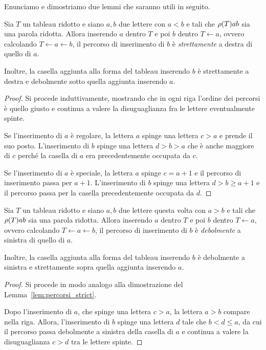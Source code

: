Enunciamo e dimostriamo due lemmi che saranno utili in seguito.

\begin{lemma} \label{lem:percorsi_strict}
    Sia $T$ un tableau ridotto e siano $a, b$ due lettere con $a < b$ e tali che 
    $\operatorname{\rho}(T)ab$ sia una parola ridotta.
    Allora inserendo $a$ dentro $T$ e poi $b$ dentro $T \leftarrow a$, ovvero
    calcolando $T \leftarrow a \leftarrow b$, il percorso di inserimento di $b$ \`e 
    \emph{strettamente} a destra di quello di $a$.

    Inoltre, la casella aggiunta alla forma del tableau inserendo $b$ \`e
    strettamente a destra e debolmente sotto quella aggiunta inserendo $a$.
\end{lemma}

\begin{proof}
    Si procede induttivamente, mostrando che in ogni riga l'ordine dei percorsi
    \`e quello giusto e continua a valere la disuguaglianza fra le lettere eventualmente
    spinte.

    Se l'inserimento di $a$ \`e regolare, la lettera $a$ spinge una lettera $c > a$ e
    prende il suo posto.
    L'inserimento di $b$ spinge una lettera $d > b > a$ che \`e anche maggiore di $c$
    perch\'e la casella di $a$ era precedentemente occupata da $c$.

    Se l'inserimento di $a$ \`e speciale, la lettera $a$ spinge $c=a+1$ e il percorso di
    inserimento passa per $a+1$.
    L'inserimento di $b$ spinge una lettera $d > b \geq a+1$ e il percorso passa per la
    casella precedentemente occupata da $d$.
\end{proof}

\begin{lemma} \label{lem:percorsi_weak}
    Sia $T$ un tableau ridotto e siano $a, b$ due lettere questa volta con $a > b$
    e tali che $\operatorname{\rho}(T)ab$ sia una parola ridotta.
    Allora inserendo $a$ dentro $T$ e poi $b$ dentro $T \leftarrow a$, ovvero
    calcolando $T \leftarrow a \leftarrow b$, il percorso di inserimento di $b$ \`e 
    \emph{debolmente} a sinistra di quello di $a$.

    Inoltre, la casella aggiunta alla forma del tableau inserendo $b$ \`e
    debolmente a sinistra e strettamente sopra quella aggiunta inserendo $a$.
\end{lemma}

\begin{proof}
    Si procede in modo analogo alla dimostrazione del Lemma~\ref{lem:percorsi_strict}.

    Dopo l'inserimento di $a$, che spinge una lettera $c>a$,
    la lettera $a > b$ compare nella riga.
    Allora, l'inserimento di $b$ spinge una lettera $d$ tale che $b < d \leq a$,
    da cui il percorso passa debolmente a sinistra della casella di $a$ e
    continua a valere la disuguaglianza $c > d$ tra le lettere spinte.
\end{proof}

